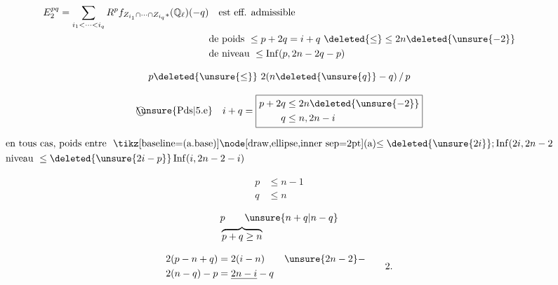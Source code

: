 \[
\begin{aligned}
E_2^{pq}=\sum_{i_1<\cdots<i_q} R^p f_{Z_{i_1}\cap\cdots\cap Z_{i_q}*}(\mathbb Q_\ell)(-q)&\quad\text{est eff. admissible}\\
&\text{de poids }\leq p+2q=i+q\ \deleted{\leq}\leq 2n\deleted{\unsure{-2}}\\
&\text{de niveau }\leq\operatorname{Inf}(p,2n-2q-p)
\end{aligned}
\]

\[ p\deleted{\unsure{\leq}}\ 2(n\deleted{\unsure{q}}-q)\,/\,p \]

\[ \text{\textcircled{\unsure{Pds|5.e}}}\quad i+q=\boxed{\begin{aligned}p+2q&\leq 2n\deleted{\unsure{-2}}\\ q&\leq n,2n-i\end{aligned}} \]

\[
\begin{aligned}
&\text{en tous cas, poids entre }\ \text{\tikz[baseline=(a.base)]\node[draw,ellipse,inner sep=2pt](a){$\leq\deleted{\unsure{2i}}$};}\operatorname{Inf}(2i,2n-2\\
&\text{niveau }\leq\deleted{\unsure{2i-p}}\operatorname{Inf}(i,2n-2-i)
\end{aligned}
\]


\[ \begin{aligned}p&\leq n-1\\q&\leq n\end{aligned} \]

\[ \begin{aligned} &p\qquad \unsure{n+q|n-q}\\[-2pt] &\overbrace{p+q\geq n}\end{aligned} \]

\[ \begin{aligned}2(p-n+q)&=2(i-n)\qquad \unsure{2n-2}-\\ 2(n-q)-p&=\underline{2n-i}-q\end{aligned}\qquad 2. \]

